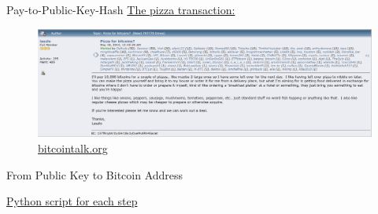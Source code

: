 \documentclass[]{beamer}
\begin{document}
%

\begin{frame}{Pay-to-Public-Key-Hash}
	\href{https://blockstream.info/tx/a1075db55d416d3ca199f55b6084e2115b9345e16c5cf302fc80e9d5fbf5d48d}{\link The pizza transaction:}\\
	\begin{figure}
	\includegraphics[scale=0.3]{../assets/images/pizza_blogpost}	
	\caption*{\href{https://bitcointalk.org/index.php?topic=137.0}{\link bitcointalk.org}}
	\end{figure}
\end{frame}

\begin{frame}{From Public Key to Bitcoin Address}
\vspace{-0.5em}
\begin{figure}
	
\end{figure}
\vspace{-1em}
\href{https://github.com/cifunibas/Bitcoin-Blockchain-Cryptoassets/blob/main/assets/scripts/bitcoin_address.py}{\link Python script for each step} \\
\end{frame}
\end{document}
